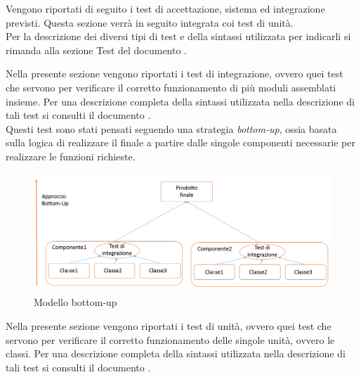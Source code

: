 	Vengono riportati di seguito i test di accettazione, sistema ed integrazione previsti. Questa sezione verrà in seguito integrata coi test di unità.\\
	Per la descrizione dei diversi tipi di test e della sintassi utilizzata per indicarli si rimanda alla sezione Test del documento .
	
	
		Nella presente sezione vengono riportati i test di integrazione, ovvero quei test che servono per verificare il corretto funzionamento di più moduli assemblati insieme. Per una descrizione completa della sintassi utilizzata nella descrizione di tali test si consulti il documento . \\
		Questi test sono stati pensati seguendo una strategia \textit{bottom-up}, ossia basata sulla logica di realizzare il  finale a partire dalle singole componenti necessarie per realizzare le funzioni richieste.
		\begin{figure}[H]
			\centering
			\includegraphics[scale=0.4]{PianoDiQualifica/Pics/bottom-up.png}
			\caption{Modello bottom-up}
		\end{figure}
			
			
		Nella presente sezione vengono riportati i test di unità, ovvero quei test che servono per verificare il corretto funzionamento delle singole unità, ovvero le classi. Per una descrizione completa della sintassi utilizzata nella descrizione di tali test si consulti il documento .
			
			
